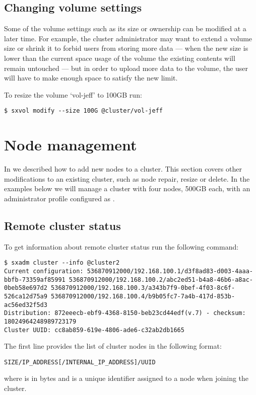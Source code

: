 \subsection{Changing volume settings}
Some of the volume settings such as its size or ownership can be
modified at a later time. For example, the cluster administrator may
want to extend a volume size or shrink it to forbid users from storing
more data --- when the new size is lower than the current space usage of
the volume the existing contents will remain untouched --- but in order
to upload more data to the volume, the user will have to make enough
space to satisfy the new limit.

To resize the volume `vol-jeff' to 100GB run:
\begin{lstlisting}
$ sxvol modify --size 100G @cluster/vol-jeff
\end{lstlisting}

\section{Node management}
In  we described how to add new nodes to a cluster. This
section covers other modifications to an existing cluster, such as node
repair, resize or delete. In the examples below we will manage a cluster
with four nodes, 500GB each, with an administrator profile configured
as .

\subsection{Remote cluster status}
To get information about remote cluster status run the following command:
\begin{lstlisting}
$ sxadm cluster --info @cluster2
Current configuration: 536870912000/192.168.100.1/d3f8ad83-d003-4aaa-bbfb-73359af85991 536870912000/192.168.100.2/abc2ed51-b4a8-46b6-a8ac-0beb58e697d2 536870912000/192.168.100.3/a343b7f9-0bef-4f03-8c6f-526ca12d75a9 536870912000/192.168.100.4/b9b05fc7-7a4b-417d-853b-ac56ed32f5d3 
Distribution: 872eeecb-ebf9-4368-8150-beb23cd44edf(v.7) - checksum: 18024964248989723179
Cluster UUID: cc8ab859-619e-4806-ade6-c32ab2db1665
\end{lstlisting}
The first line provides the list of cluster nodes in the following format:
\begin{lstlisting}
SIZE/IP_ADDRESS[/INTERNAL_IP_ADDRESS]/UUID
\end{lstlisting}
where  is in bytes and  is a unique identifier assigned to a node
when joining the cluster.

